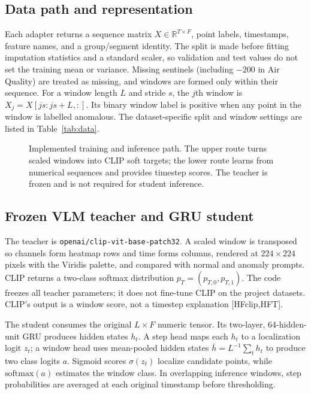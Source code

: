 \documentclass[twoside,english]{article}
\renewcommand{\cite}[1]{[#1]}
\begin{document}
\subsection{Data path and representation}
Each adapter returns a sequence matrix $X\in\mathbb{R}^{T\times F}$, point labels, timestamps, feature names, and a group/segment identity. The split is made before fitting imputation statistics and a standard scaler, so validation and test values do not set the training mean or variance. Missing sentinels (including $-200$ in Air Quality) are treated as missing, and windows are formed only within their sequence. For a window length $L$ and stride $s$, the $j$th window is $X_j=X[js:js+L,:]$. Its binary window label is positive when any point in the window is labelled anomalous. The dataset-specific split and window settings are listed in Table~\ref{tab:data}.

\begin{figure}[t]
\centering

\caption{Implemented training and inference path. The upper route turns scaled windows into CLIP soft targets; the lower route learns from numerical sequences and provides timestep scores. The teacher is frozen and is not required for student inference.}
\label{fig:architecture}
\end{figure}

\subsection{Frozen VLM teacher and GRU student}
The teacher is \texttt{openai/clip-vit-base-patch32}. A scaled window is transposed so channels form heatmap rows and time forms columns, rendered at $224\times224$ pixels with the Viridis palette, and compared with normal and anomaly prompts. CLIP returns a two-class softmax distribution $p_T=(p_{T,0},p_{T,1})$. The code freezes all teacher parameters; it does not fine-tune CLIP on the project datasets. CLIP's output is a window score, not a timestep explanation \cite{HFclip,HFT}.

The student consumes the original $L\times F$ numeric tensor. Its two-layer, 64-hidden-unit GRU produces hidden states $h_t$. A step head maps each $h_t$ to a localization logit $z_t$; a window head uses mean-pooled hidden states $\bar h=L^{-1}\sum_t h_t$ to produce two class logits $a$. Sigmoid scores $\sigma(z_t)$ localize candidate points, while $\mathrm{softmax}(a)$ estimates the window class. In overlapping inference windows, step probabilities are averaged at each original timestamp before thresholding.
\end{document}
